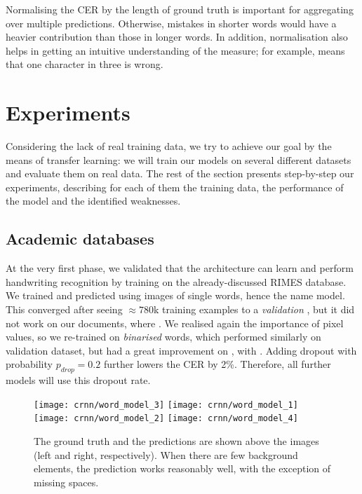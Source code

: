 			Normalising the CER by the length of ground truth is important for aggregating over multiple predictions. Otherwise, mistakes in shorter words would have a heavier contribution than those in longer words. In addition, normalisation also helps in getting an intuitive understanding of the measure; for example,  means that one character in three is wrong.



\section{Experiments}\label{sec:transcription_experiments}
	Considering the lack of real training data, we try to achieve our goal by the means of transfer learning: we will train our models on several different datasets and evaluate them on real data. The rest of the section presents step-by-step our experiments, describing for each of them the training data, the performance of the model and the identified weaknesses.


	\subsection{Academic databases}
		At the very first phase, we validated that the architecture can learn and perform handwriting recognition by training on the already-discussed RIMES database. We trained and predicted using images of single words, hence the name  model. This converged after seeing \(\approx 780\)k training examples to a \emph{validation} ,	but it did not work on our documents, where . We realised again the importance of pixel values, so we re-trained on \emph{binarised} words, which performed similarly on validation dataset, but had a great improvement on , with . Adding dropout with probability \(p_\mathit{drop} = 0.2\) further lowers the CER by 2\%. Therefore, all further models will use this dropout rate.

		\begin{figure}
			\texttt{[image: crnn/word\_model\_3]}
			\texttt{[image: crnn/word\_model\_1]}
			\texttt{[image: crnn/word\_model\_2]}
			\texttt{[image: crnn/word\_model\_4]}
			\caption[Predictions of  model]{The ground truth and the predictions are shown above the images (left and right, respectively). When there are few background elements, the prediction works reasonably well, with the exception of missing spaces.}
			\label{fig:crnn_word_drop_model}
		\end{figure}

